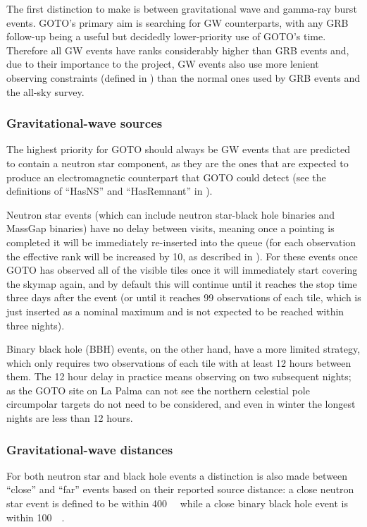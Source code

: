 \begin{colsection}
\begin{colsection}
The first distinction to make is between gravitational wave and gamma-ray burst events. GOTO's primary aim is searching for GW counterparts, with any GRB follow-up being a useful but decidedly lower-priority use of GOTO's time. Therefore all GW events have ranks considerably higher than GRB events and, due to their importance to the project, GW events also use more lenient observing constraints (defined in ) than the normal ones used by GRB events and the all-sky survey.

\subsubsection{Gravitational-wave sources}

The highest priority for GOTO should always be GW events that are predicted to contain a neutron star component, as they are the ones that are expected to produce an electromagnetic counterpart that GOTO could detect (see the definitions of ``HasNS'' and ``HasRemnant'' in ).

Neutron star events (which can include neutron star-black hole binaries and MassGap binaries) have no delay between visits, meaning once a pointing is completed it will be immediately re-inserted into the queue (for each observation the effective rank will be increased by 10, as described in ). For these events once GOTO has observed all of the visible tiles once it will immediately start covering the skymap again, and by default this will continue until it reaches the stop time three days after the event (or until it reaches 99 observations of each tile, which is just inserted as a nominal maximum and is not expected to be reached within three nights).

Binary black hole (BBH) events, on the other hand, have a more limited  strategy, which only requires two observations of each tile with at least 12 hours between them. The 12 hour delay in practice means observing on two subsequent nights; as the GOTO site on La Palma can not see the northern celestial pole circumpolar targets do not need to be considered, and even in winter the longest nights are less than 12 hours.

\subsubsection{Gravitational-wave distances}

For both neutron star and black hole events a distinction is also made between ``close'' and ``far'' events based on their reported source distance: a close neutron star event is defined to be within \SI{400}{\mega\parsec} while a close binary black hole event is within \SI{100}{\mega\parsec}.


\end{colsection}
\end{colsection}
